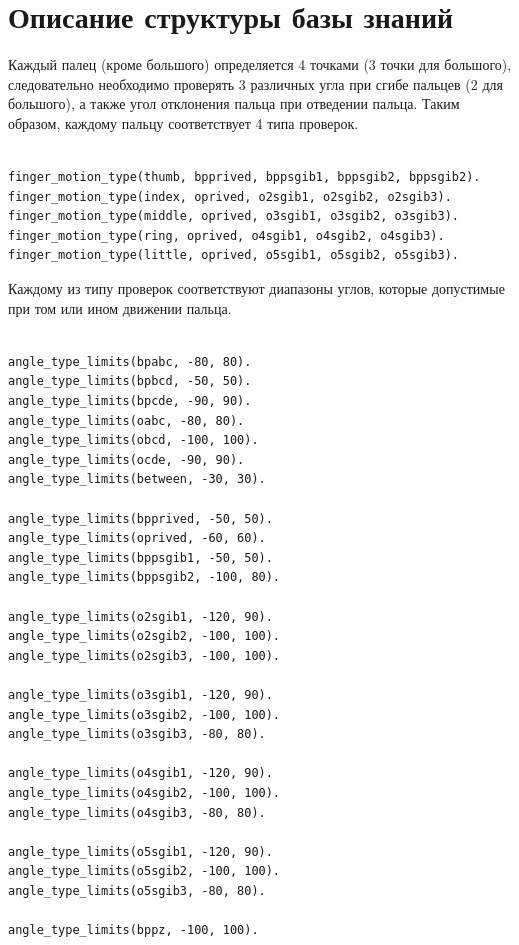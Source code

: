 \section{Описание структуры базы знаний}
\hspace{0.6cm}Каждый палец (кроме большого) определяется 4 точками (3 точки для большого), следовательно необходимо проверять 3 различных угла при сгибе пальцев (2 для большого), а также угол отклонения пальца при отведении пальца. Таким образом, каждому пальцу соответствует 4 типа проверок.
\begin{lstlisting}[caption=Знания о типах проверок каждого пальца, label=list:finger_check]
%finger_motion_type(FingerType, AbductionType, Flexion1, Flexion2, Flexion3).

finger_motion_type(thumb, bpprived, bppsgib1, bppsgib2, bppsgib2).
finger_motion_type(index, oprived, o2sgib1, o2sgib2, o2sgib3).
finger_motion_type(middle, oprived, o3sgib1, o3sgib2, o3sgib3).
finger_motion_type(ring, oprived, o4sgib1, o4sgib2, o4sgib3).
finger_motion_type(little, oprived, o5sgib1, o5sgib2, o5sgib3).
\end{lstlisting}
Каждому из типу проверок соответствуют диапазоны углов, которые допустимые при том или ином движении пальца.
\begin{lstlisting}[caption=Знания об амплитудах углов, label=list:angle_limits]
%angle_type_limits(Finger, MinAngle, MaxAngle)

angle_type_limits(bpabc, -80, 80).
angle_type_limits(bpbcd, -50, 50).
angle_type_limits(bpcde, -90, 90).
angle_type_limits(oabc, -80, 80).
angle_type_limits(obcd, -100, 100).
angle_type_limits(ocde, -90, 90).
angle_type_limits(between, -30, 30).

angle_type_limits(bpprived, -50, 50).
angle_type_limits(oprived, -60, 60).
angle_type_limits(bppsgib1, -50, 50).
angle_type_limits(bppsgib2, -100, 80).

angle_type_limits(o2sgib1, -120, 90).
angle_type_limits(o2sgib2, -100, 100).
angle_type_limits(o2sgib3, -100, 100).

angle_type_limits(o3sgib1, -120, 90).
angle_type_limits(o3sgib2, -100, 100).
angle_type_limits(o3sgib3, -80, 80).

angle_type_limits(o4sgib1, -120, 90).
angle_type_limits(o4sgib2, -100, 100).
angle_type_limits(o4sgib3, -80, 80).

angle_type_limits(o5sgib1, -120, 90).
angle_type_limits(o5sgib2, -100, 100).
angle_type_limits(o5sgib3, -80, 80).

angle_type_limits(bppz, -100, 100).
\end{lstlisting}
